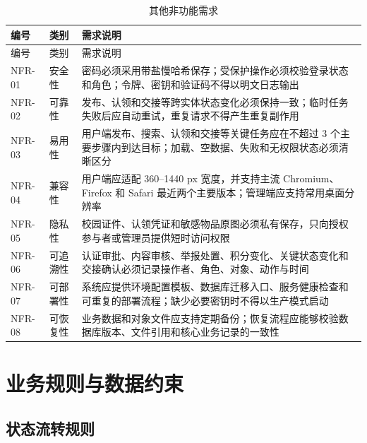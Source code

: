 \small
\begin{longtable}{L{1.6cm} L{2.4cm} L{8.9cm}}
  \caption{其他非功能需求}\label{tab:other-nfr}\\
  \toprule
  编号 & 类别 & 需求说明 \\
  \midrule
  \endfirsthead
  \toprule
  编号 & 类别 & 需求说明 \\
  \midrule
  \endhead
  NFR-01 & 安全性 & 密码必须采用带盐慢哈希保存；受保护操作必须校验登录状态和角色；令牌、密钥和验证码不得以明文日志输出 \\
  NFR-02 & 可靠性 & 发布、认领和交接等跨实体状态变化必须保持一致；临时任务失败后应自动重试，重复请求不得产生重复副作用 \\
  NFR-03 & 易用性 & 用户端发布、搜索、认领和交接等关键任务应在不超过 3 个主要步骤内到达目标；加载、空数据、失败和无权限状态必须清晰区分 \\
  NFR-04 & 兼容性 & 用户端应适配 360--1440 px 宽度，并支持主流 Chromium、Firefox 和 Safari 最近两个主要版本；管理端应支持常用桌面分辨率 \\
  NFR-05 & 隐私性 & 校园证件、认领凭证和敏感物品原图必须私有保存，只向授权参与者或管理员提供短时访问权限 \\
  NFR-06 & 可追溯性 & 认证审批、内容审核、举报处置、积分变化、关键状态变化和交接确认必须记录操作者、角色、对象、动作与时间 \\
  NFR-07 & 可部署性 & 系统应提供环境配置模板、数据库迁移入口、服务健康检查和可重复的部署流程；缺少必要密钥时不得以生产模式启动 \\
  NFR-08 & 可恢复性 & 业务数据和对象文件应支持定期备份；恢复流程应能够校验数据库版本、文件引用和核心业务记录的一致性 \\
  \bottomrule
\end{longtable}
\normalsize

\section{业务规则与数据约束}

\subsection{状态流转规则}

